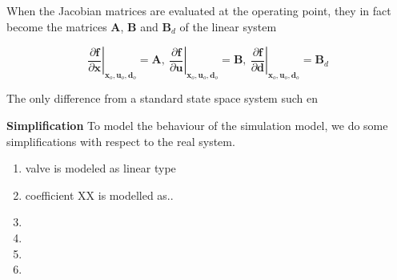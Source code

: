 %

When the Jacobian matrices are evaluated at the operating point, they in fact become the matrices $ \textbf{A} $, $ \textbf{B} $ and $ \textbf{B}_d  $ of the linear system

\begin{equation}
	\left. \dfrac{\partial \textbf{f}}{\partial \textbf{x}} \right |_{\textbf{x}_o, \textbf{u}_o, \textbf{d}_o} = \textbf{A}, \
	\left. \dfrac{\partial \textbf{f}}{\partial \textbf{u}} \right |_{\textbf{x}_o, \textbf{u}_o, \textbf{d}_o} = \textbf{B}, \
	\left. \dfrac{\partial \textbf{f}}{\partial \textbf{d}} \right |_{\textbf{x}_o, \textbf{u}_o, \textbf{d}_o} = \textbf{B}_d
\end{equation}

The only difference from a standard state space system such en

\textbf{Simplification}
To model the behaviour of the simulation model, we do some simplifications with respect to the real system. 
\begin{enumerate}
	\item valve is modeled as linear type
	\item coefficient XX is modelled as..
	\item
	\item
	\item
	\item
	
\end{enumerate}